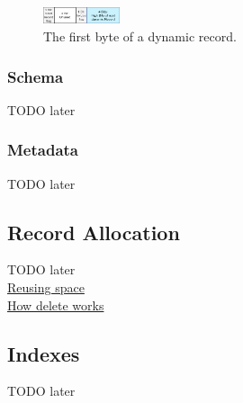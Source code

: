 \documentclass[a4paper,10pt]{article}
\begin{document}
            \begin{figure}[htp]\label{dynamic_first}
                \begin{center}
                    \includegraphics[keepaspectratio,height=0.2\textheight,width=0.2\textwidth]{img/03_record/dynamic_first_byte.png}
                \end{center}
                \caption{The first byte of a dynamic record.} %
            \end{figure}

                
        \subsubsection{Schema}
            TODO later
        \subsubsection{Metadata}
            TODO later
            
        \subsection{Record Allocation}
            TODO later \\
            \href{https://neo4j.com/docs/operations-manual/current/performance/space-reuse/\#space-reuse}{Reusing space} \\
            \href{https://neo4j.com/developer/kb/how-deletes-workin-neo4j/}{How delete works} \\
        

        \subsection{Indexes}
            TODO later
        
\end{document}
